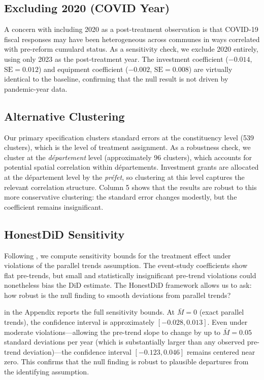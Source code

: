 \documentclass[12pt]{article}
\begin{document}
\subsection{Excluding 2020 (COVID Year)}

A concern with including 2020 as a post-treatment observation is that COVID-19 fiscal responses may have been heterogeneous across communes in ways correlated with pre-reform cumulard status. As a sensitivity check, we exclude 2020 entirely, using only 2023 as the post-treatment year. The investment coefficient ($-0.014$, $\text{SE} = 0.012$) and equipment coefficient ($-0.002$, $\text{SE} = 0.008$) are virtually identical to the baseline, confirming that the null result is not driven by pandemic-year data.

\subsection{Alternative Clustering}

Our primary specification clusters standard errors at the constituency level (539 clusters), which is the level of treatment assignment. As a robustness check, we cluster at the \textit{département} level (approximately 96 clusters), which accounts for potential spatial correlation within départements. Investment grants are allocated at the département level by the \textit{préfet}, so clustering at this level captures the relevant correlation structure. Column 5 shows that the results are robust to this more conservative clustering: the standard error changes modestly, but the coefficient remains insignificant.

\subsection{HonestDiD Sensitivity}

Following \citet{rambachan2023more}, we compute sensitivity bounds for the treatment effect under violations of the parallel trends assumption. The event-study coefficients show flat pre-trends, but small and statistically insignificant pre-trend violations could nonetheless bias the DiD estimate. The HonestDiD framework allows us to ask: how robust is the null finding to smooth deviations from parallel trends?

 in the Appendix reports the full sensitivity bounds. At $\bar{M} = 0$ (exact parallel trends), the confidence interval is approximately $[-0.028, 0.013]$. Even under moderate violations---allowing the pre-trend slope to change by up to $\bar{M} = 0.05$ standard deviations per year (which is substantially larger than any observed pre-trend deviation)---the confidence interval $[-0.123, 0.046]$ remains centered near zero. This confirms that the null finding is robust to plausible departures from the identifying assumption.
\end{document}
